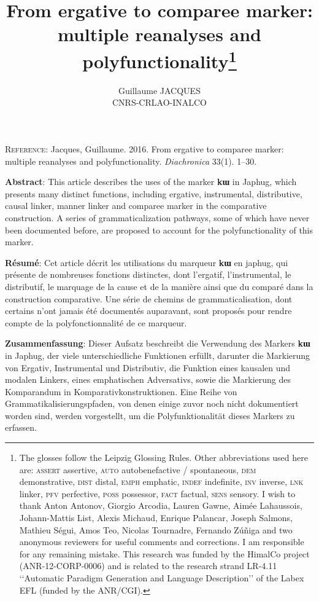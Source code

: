 \documentclass[oldfontcommands,oneside,a4paper,11pt]{article}
\newcommand{\ipa}[1]{{\phon\textbf{#1}}}
\begin{document}
 
 
\title{From ergative to comparee marker: multiple reanalyses and polyfunctionality\footnote{The glosses follow the Leipzig Glossing Rules. Other abbreviations used here are:   \textsc{assert} assertive, \textsc{auto} autobenefactive / spontaneous,  \textsc{dem} demonstrative, \textsc{dist} distal, \textsc{emph} emphatic, \textsc{indef} indefinite, \textsc{inv} inverse,  \textsc{lnk} linker, \textsc{pfv} perfective, \textsc{poss} possessor, \textsc{fact} factual,  \textsc{sens} sensory. I wish to thank Anton Antonov, Giorgio Arcodia, Lauren Gawne, Aimée Lahaussois, Johann-Mattis List, Alexis Michaud,  Enrique Palancar, Joseph Salmons, Mathieu Ségui, Amos Teo, Nicolas Tournadre, Fernando Zúñiga and two anonymous reviewers for useful comments and corrections. I am responsible for any remaining mistake.  This research was funded by the HimalCo project (ANR-12-CORP-0006) and is related to the research strand LR-4.11 ‘‘Automatic Paradigm Generation and Language Description’’ of the Labex EFL (funded by the ANR/CGI).}}
 

\author{Guillaume JACQUES\\CNRS-CRLAO-INALCO}
\maketitle
   \sloppy

\textsc{Reference}: Jacques, Guillaume. 2016. From ergative to comparee marker: multiple
reanalyses and polyfunctionality. \textit{Diachronica} 33(1). 1–30.   
   
\textbf{Abstract}: This article describes the uses of the marker  \ipa{kɯ} in Japhug, which presents many distinct functions, including ergative, instrumental, distributive, causal linker, manner linker and comparee marker in the comparative construction. A series of grammaticalization pathways, some of which have never been documented before, are proposed to account for the polyfunctionality of this marker.

\textbf{Résumé}: Cet article décrit les utilisations du marqueur \ipa{kɯ} en japhug, qui présente de nombreuses fonctions distinctes, dont l'ergatif, l'instrumental, le distributif, le marquage de la cause et de la manière ainsi que du comparé dans la construction comparative. Une série de chemins de grammaticalisation, dont certains n'ont jamais été documentés auparavant, sont proposés pour rendre compte de la polyfonctionnalité de ce marqueur.

\textbf{Zusammenfassung}: Dieser Aufsatz beschreibt die Verwendung des Markers \ipa{kɯ} in Japhug, der viele unterschiedliche Funktionen erfüllt, darunter die Markierung von Ergativ, Instrumental und Distributiv, die Funktion eines kausalen und modalen Linkers, eines emphatischen Adversativs, sowie die Markierung des Komparandum in Komparativkonstruktionen. Eine Reihe von Grammatikalisierungspfaden, von denen einige zuvor noch nicht dokumentiert worden sind, werden vorgestellt, um die Polyfunktionalität dieses Markers zu erfassen.
\end{document}
